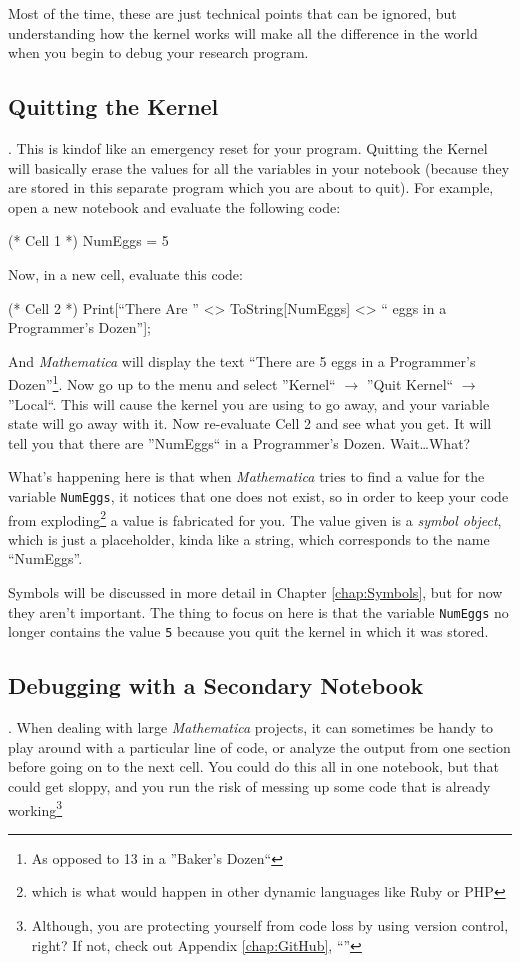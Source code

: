 Most of the time, these are just technical points that can be ignored, but understanding how the kernel works will make all the difference in the world when you begin to debug your research program.

\subsection{Quitting the Kernel}. This is kindof like an emergency reset for your program. Quitting the Kernel will basically erase the values for all the variables in your notebook (because they are stored in this separate program which you are about to quit). For example, open a new notebook and evaluate the following code:

\begin{code}
	   (* Cell 1 *)
	   NumEggs = 5
\end{code}

Now, in a new cell, evaluate this code:

\begin{code}
	(* Cell 2 *)
	Print[``There Are '' <> ToString[NumEggs] <> `` eggs in a Programmer's Dozen''];
\end{code}

And \emph{Mathematica} will display the text ``There are 5 eggs in a Programmer's Dozen''\footnote{As opposed to 13 in a ''Baker's Dozen``}. Now go up to the menu and select ''Kernel`` $\rightarrow$ ''Quit Kernel`` $\rightarrow$ ''Local``. This will cause the kernel you are using to go away, and your variable state will go away with it. Now re-evaluate Cell 2 and see what you get. It will tell you that there are ''NumEggs`` in a Programmer's Dozen. Wait\ldots What?

What's happening here is that when \emph{Mathematica} tries to find a value for the variable \texttt{NumEggs}, it notices that one does not exist, so in order to keep your code from exploding\footnote{which is what would happen in other dynamic languages like Ruby or PHP} a value is fabricated for you. The value given is a \emph{symbol object}, which is just a placeholder, kinda like a string, which corresponds to the name ``NumEggs''.

Symbols will be discussed in more detail in Chapter \ref{chap:Symbols}, but for now they aren't important. The thing to focus on here is that the variable \texttt{NumEggs} no longer contains the value \texttt{5} because you quit the kernel in which it was stored.

\subsection{Debugging with a Secondary Notebook}. When dealing with large \emph{Mathematica} projects, it can sometimes be handy to play around with a particular line of code, or analyze the output from one section before going on to the next cell. You could do this all in one notebook, but that could get sloppy, and you run the risk of messing up some code that is already working\footnote{Although, you are protecting yourself from code loss by using version control, right? If not, check out Appendix \ref{chap:GitHub}, ``''}

